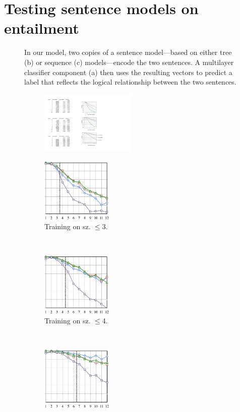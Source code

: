 \section{Testing sentence models on entailment} \label{methods}

\begin{figure}[t]
  \centering
  
  \caption{In our model, two copies of a sentence model---based on either tree (b) or sequence (c) models---encode the two sentences. A multilayer classifier component (a) then uses the resulting vectors to predict a label that reflects the logical relationship between the two sentences.}
  \label{sample-figure}
\end{figure}

\begin{figure}[t]
  \centering
  \begin{subfigure}[t]{0.04\textwidth}
      \includegraphics[height=1.2in]{scale.pdf}
\end{subfigure}
\begin{subfigure}[t]{0.24\textwidth}
  \includegraphics[height=1.2in]{fig3c.pdf}
  \caption{Training on sz. $\le$3.}
  \end{subfigure}~~~
\begin{subfigure}[t]{0.24\textwidth}
    \includegraphics[height=1.2in]{fig4c.pdf}
  \caption{Training on sz. $\le$4.}
  \end{subfigure}~~~
\begin{subfigure}[t]{0.24\textwidth}
      \includegraphics[height=1.2in]{fig6c.pdf}

\end{subfigure}
\end{figure}
